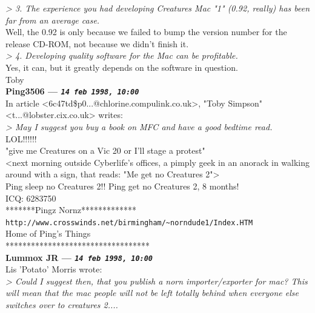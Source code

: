 \documentclass[11pt,twoside,a4paper]{article}
\begin{document}
\begin{multicols*}{2}
\emph{> 3. The experience you had developing Creatures Mac "1" (0.92, really) has been far from an average case.}~\\

Well, the 0.92 is only because we failed to bump the version number for the release CD-ROM, not because we didn't finish it.~\\

\emph{> 4. Developing quality software for the Mac can be profitable.}~\\

Yes, it can, but it greatly depends on the software in question.~\\

Toby~\\

 
		
	
		
\textbf{Ping3506 --- \emph{\texttt{14 feb 1998, 10:00}}}~\\

In article <6c47td\$p0...@chlorine.compulink.co.uk>, "Toby Simpson" <t...@lobster.cix.co.uk> writes:~\\
\emph{> May I suggest you buy a book on MFC and have a good bedtime read.}~\\

LOL!!!!!!~\\

"give me Creatures on a Vic 20 or I'll stage a protest"~\\

<next morning outside Cyberlife's offices, a pimply geek in an anorack in walking around with a sign, that reads: "Me get no Creatures 2">~\\

Ping sleep no Creatures 2!! Ping get no Creatures 2, 8 months!~\\
ICQ:  6283750~\\
*******Pingz Nornz*************~\\
\texttt{http://www.crosswinds.net/birmingham/\textasciitilde norndude1/Index.HTM}~\\
Home of Ping's Things~\\
**********************************~\\

 
		
	
		
\textbf{Lummox JR --- \emph{\texttt{14 feb 1998, 10:00}}}~\\

Lis 'Potato' Morris wrote:~\\
\emph{> Could I suggest then, that you publish a norn importer/exporter for mac? This will mean that the mac people will not be left totally behind when everyone else switches over to creatures 2....}~\\


\end{multicols*}
\end{document}

